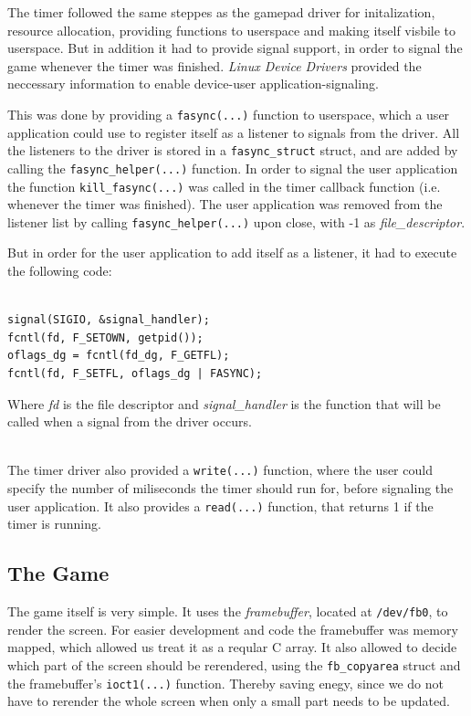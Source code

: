 The timer followed the same steppes as the gamepad driver for initalization, resource allocation, providing functions to userspace and making itself visbile to userspace. But in addition it had to provide signal support, in order to signal the game whenever the timer was finished. \textit{Linux Device Drivers}\cite{LDD} provided the neccessary information to enable device-user application-signaling.  

This was done by providing a \texttt{fasync(...)} function to userspace, which a user application could use to register itself as a listener to signals from the driver. All the listeners to the driver is stored in a \texttt{fasync\_struct} struct, and are added by calling the \texttt{fasync\_helper(...)} function. In order to signal the user application the function \texttt{kill\_fasync(...)} was called in the timer callback function (i.e. whenever the timer was finished). The user application was removed from the listener list by calling  \texttt{fasync\_helper(...)} upon close, with -1 as \textit{file\_descriptor}. 

But in order for the user application to add itself as a listener, it had to execute the following code: 

\begin{lstlisting}[frame=single]  % Start your code-block

signal(SIGIO, &signal_handler);
fcntl(fd, F_SETOWN, getpid());
oflags_dg = fcntl(fd_dg, F_GETFL);
fcntl(fd, F_SETFL, oflags_dg | FASYNC);

\end{lstlisting}

Where \textit{fd} is the file descriptor and \textit{signal\_handler} is the function that will be called when a signal from the driver occurs. 

\hfill \\

The timer driver also provided a \texttt{write(...)} function, where the user could specify the number of miliseconds the timer should run for, before signaling the user application. It also provides a \texttt{read(...)} function, that returns 1 if the timer is running.  

\subsection{The Game} 

The game itself is very simple. It uses the \textit{framebuffer}, located at \texttt{/dev/fb0}, to render the screen. For easier development and code the framebuffer was memory mapped, which allowed us treat it as a reqular C array. It also allowed to decide which part of the screen should be rerendered, using the \texttt{fb\_copyarea} struct and the framebuffer's \texttt{ioct1(...)} function. Thereby saving enegy, since we do not have to rerender the whole screen when only a small part needs to be updated.

